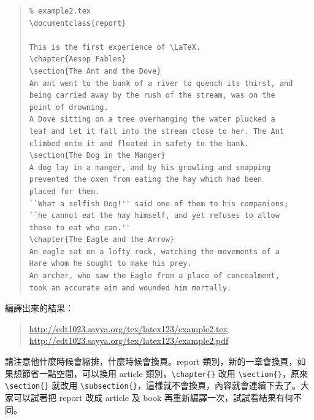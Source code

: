 \begin{quote}
   \begin{verbatim}
% example2.tex
\documentclass{report}

This is the first experience of \LaTeX.
\chapter{Aesop Fables}
\section{The Ant and the Dove}
An ant went to the bank of a river to quench its thirst, and
being carried away by the rush of the stream, was on the
point of drowning.
A Dove sitting on a tree overhanging the water plucked a
leaf and let it fall into the stream close to her. The Ant
climbed onto it and floated in safety to the bank.
\section{The Dog in the Manger}
A dog lay in a manger, and by his growling and snapping
prevented the oxen from eating the hay which had been
placed for them.
``What a selfish Dog!'' said one of them to his companions;
``he cannot eat the hay himself, and yet refuses to allow
those to eat who can.''
\chapter{The Eagle and the Arrow}
An eagle sat on a lofty rock, watching the movements of a
Hare whom he sought to make his prey.
An archer, who saw the Eagle from a place of concealment,
took an accurate aim and wounded him mortally.

\end{verbatim}
\end{quote}

編譯出來的結果：

\begin{quote}
   \url{http://edt1023.sayya.org/tex/latex123/example2.tex}\\
   \url{http://edt1023.sayya.org/tex/latex123/example2.pdf}
\end{quote}

請注意他什麼時候會縮排，什麼時候會換頁。{\ttfamily report} 類別，新的一章會換頁，如果想節省一點空間，可以換用 {\ttfamily article} 類別，\verb|\chapter{}| 改用 \verb|\section{}|，原來 \verb|\section{}| 就改用 \verb|\subsection{}|，這樣就不會換頁，內容就會連續下去了。大家可以試著把 {\ttfamily report} 改成 {\ttfamily article} 及 {\ttfamily book} 再重新編譯一次，試試看結果有何不同。

